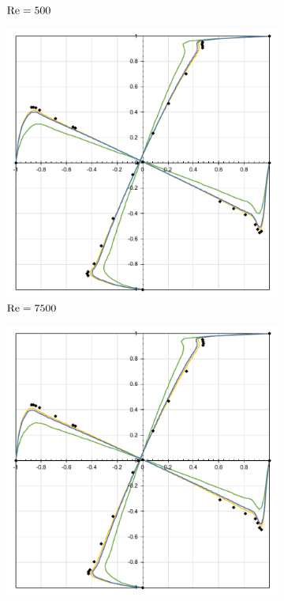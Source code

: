\begin{figure}[h]
\begin{subfigure}{0.4\textwidth}
    \caption{$\mathrm{Re}=500$}
    \end{subfigure}
    \begin{subfigure}{0.4\textwidth}
    \includegraphics[width=\linewidth]{Figuras/Cavity/Re7500.pdf}
    \caption{$\mathrm{Re}=7500$}
    \end{subfigure}
    \begin{subfigure}{0.4\textwidth}
    \includegraphics[width=\linewidth]{Figuras/Cavity/Re10000.pdf}

\end{subfigure}
\end{figure}
